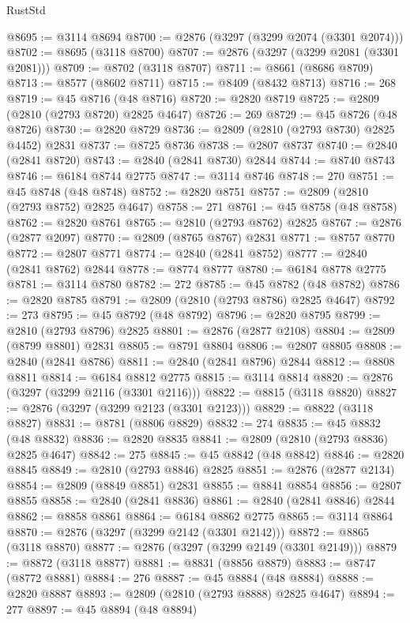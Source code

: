 \begin{lexlean}{RustStd}
\begin{coremodule}
@8695 := @3114 @8694
@8700 := @2876 (@3297 (@3299 @2074 (@3301 @2074)))
@8702 := @8695 (@3118 @8700)
@8707 := @2876 (@3297 (@3299 @2081 (@3301 @2081)))
@8709 := @8702 (@3118 @8707)
@8711 := @8661 (@8686 @8709)
@8713 := @8577 (@8602 @8711)
@8715 := @8409 (@8432 @8713)
@8716 := 268
@8719 := @45 @8716 (@48 @8716)
@8720 := @2820 @8719
@8725 := @2809 (@2810 (@2793 @8720) @2825 @4647)
@8726 := 269
@8729 := @45 @8726 (@48 @8726)
@8730 := @2820 @8729
@8736 := @2809 (@2810 (@2793 @8730) @2825 @4452) @2831
@8737 := @8725 @8736
@8738 := @2807 @8737
@8740 := @2840 (@2841 @8720)
@8743 := @2840 (@2841 @8730) @2844
@8744 := @8740 @8743
@8746 := @6184 @8744 @2775
@8747 := @3114 @8746
@8748 := 270
@8751 := @45 @8748 (@48 @8748)
@8752 := @2820 @8751
@8757 := @2809 (@2810 (@2793 @8752) @2825 @4647)
@8758 := 271
@8761 := @45 @8758 (@48 @8758)
@8762 := @2820 @8761
@8765 := @2810 (@2793 @8762) @2825
@8767 := @2876 (@2877 @2097)
@8770 := @2809 (@8765 @8767) @2831
@8771 := @8757 @8770
@8772 := @2807 @8771
@8774 := @2840 (@2841 @8752)
@8777 := @2840 (@2841 @8762) @2844
@8778 := @8774 @8777
@8780 := @6184 @8778 @2775
@8781 := @3114 @8780
@8782 := 272
@8785 := @45 @8782 (@48 @8782)
@8786 := @2820 @8785
@8791 := @2809 (@2810 (@2793 @8786) @2825 @4647)
@8792 := 273
@8795 := @45 @8792 (@48 @8792)
@8796 := @2820 @8795
@8799 := @2810 (@2793 @8796) @2825
@8801 := @2876 (@2877 @2108)
@8804 := @2809 (@8799 @8801) @2831
@8805 := @8791 @8804
@8806 := @2807 @8805
@8808 := @2840 (@2841 @8786)
@8811 := @2840 (@2841 @8796) @2844
@8812 := @8808 @8811
@8814 := @6184 @8812 @2775
@8815 := @3114 @8814
@8820 := @2876 (@3297 (@3299 @2116 (@3301 @2116)))
@8822 := @8815 (@3118 @8820)
@8827 := @2876 (@3297 (@3299 @2123 (@3301 @2123)))
@8829 := @8822 (@3118 @8827)
@8831 := @8781 (@8806 @8829)
@8832 := 274
@8835 := @45 @8832 (@48 @8832)
@8836 := @2820 @8835
@8841 := @2809 (@2810 (@2793 @8836) @2825 @4647)
@8842 := 275
@8845 := @45 @8842 (@48 @8842)
@8846 := @2820 @8845
@8849 := @2810 (@2793 @8846) @2825
@8851 := @2876 (@2877 @2134)
@8854 := @2809 (@8849 @8851) @2831
@8855 := @8841 @8854
@8856 := @2807 @8855
@8858 := @2840 (@2841 @8836)
@8861 := @2840 (@2841 @8846) @2844
@8862 := @8858 @8861
@8864 := @6184 @8862 @2775
@8865 := @3114 @8864
@8870 := @2876 (@3297 (@3299 @2142 (@3301 @2142)))
@8872 := @8865 (@3118 @8870)
@8877 := @2876 (@3297 (@3299 @2149 (@3301 @2149)))
@8879 := @8872 (@3118 @8877)
@8881 := @8831 (@8856 @8879)
@8883 := @8747 (@8772 @8881)
@8884 := 276
@8887 := @45 @8884 (@48 @8884)
@8888 := @2820 @8887
@8893 := @2809 (@2810 (@2793 @8888) @2825 @4647)
@8894 := 277
@8897 := @45 @8894 (@48 @8894)

\end{coremodule}
\end{lexlean}
